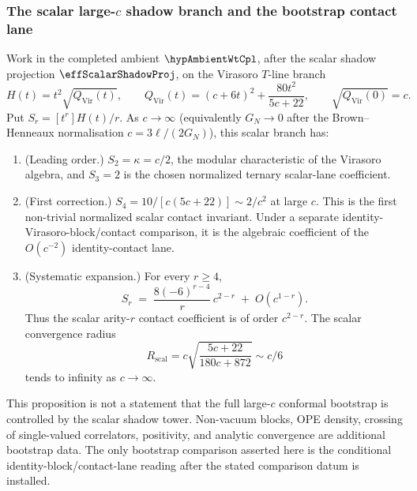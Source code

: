 \subsubsection*{The scalar large-$c$ shadow branch and the bootstrap contact lane}

\begin{proposition}
\label{prop:large-c-bootstrap}%
%
%
Work in the completed ambient \(\hypAmbientWtCpl\), after the scalar
shadow projection \(\effScalarShadowProj\), on the Virasoro \(T\)-line
branch
\[
H(t)=t^2\sqrt{Q_{\mathrm{Vir}}(t)},\qquad
Q_{\mathrm{Vir}}(t)=(c+6t)^2+\frac{80t^2}{5c+22},\qquad
\sqrt{Q_{\mathrm{Vir}}(0)}=c .
\]
Put \(S_r=[t^r]H(t)/r\).  As \(c\to\infty\)
\textup{(}equivalently \(G_N\to0\) after the Brown--Henneaux
normalisation \(c=3\ell/(2G_N)\)\textup{)}, this scalar branch has:
\begin{enumerate}[label=\textup{(\roman*)}]
\item \textup{(Leading order.)}
 $S_2 = \kappa = c/2$, the modular characteristic of the
 Virasoro algebra, and \(S_3=2\) is the chosen normalized ternary
 scalar-lane coefficient.
\item \textup{(First correction.)}
 $S_4 = 10/[c(5c+22)] \sim 2/c^2$ at large $c$.
 This is the first non-trivial normalized scalar contact invariant.
 Under a separate identity-Virasoro-block/contact comparison, it is
 the algebraic coefficient of the \(O(c^{-2})\) identity-contact lane.
\item \textup{(Systematic expansion.)}
 For every \(r\ge4\),
 \begin{equation}\label{eq:large-c-scalar-shadow}
 S_r
 \;=\;
 \frac{8(-6)^{r-4}}{r}\,c^{2-r}
 \;+\;
 O(c^{1-r}) .
 \end{equation}
 Thus the scalar arity-\(r\) contact coefficient is of order
 \(c^{2-r}\).  The scalar convergence radius
 \[
 R_{\mathrm{scal}}
 =c\sqrt{\frac{5c+22}{180c+872}}
 \sim c/6
 \]
 tends to infinity as \(c\to\infty\).
\end{enumerate}
This proposition is not a statement that the full large-\(c\)
conformal bootstrap is controlled by the scalar shadow tower.
Non-vacuum blocks, OPE density, crossing of single-valued
correlators, positivity, and analytic convergence are additional
bootstrap data.  The only bootstrap comparison asserted here is the
conditional identity-block/contact-lane reading after the stated
comparison datum is installed.
\end{proposition}

